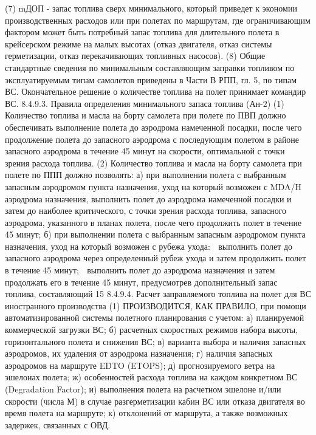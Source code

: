 (7) mДОП - запас топлива сверх минимального, который приведет к экономии производственных расходов или при полетах по маршрутам, где ограничивающим фактором может быть потребный запас топлива для длительного полета в крейсерском режиме на малых высотах (отказ двигателя, отказ системы герметизации, отказ перекачивающих топливных насосов). 
(8) Общие стандартные сведения по минимальным составляющим заправки топливом по эксплуатируемым типам самолетов приведены в Части В РПП, гл. 5, по типам ВС.
Окончательное решение о количестве топлива на полет принимает командир ВС.
8.4.9.3. Правила определения минимального запаса топлива (Ан-2)
(1) Количество топлива и масла на борту самолета при полете по ПВП должно обеспечивать выполнение полета до аэродрома намеченной посадки, после чего продолжение полета до запасного аэродрома с последующим полетом в районе запасного аэродрома в течение 45 минут на скорости, оптимальной с точки зрения расхода топлива. 
(2) Количество топлива и масла на борту самолета при полете по ППП должно позволять: 
а)	при выполнении полета с выбранным запасным аэродромом пункта назначения, уход на который возможен с MDA/H аэродрома назначения, выполнить полет до аэродрома намеченной посадки и затем до наиболее критического, с точки зрения расхода топлива, запасного аэродрома, указанного в планах полета, после чего продолжить полет в течение 45 минут; 
б)	при выполнении полета с выбранным запасным аэродромом пункта назначения, уход на который возможен с рубежа ухода: 
	выполнить полет до запасного аэродрома через определенный рубеж ухода и затем продолжить полет в течение 45 минут; 
	выполнить полет до аэродрома назначения и затем продолжать его в течение 45 минут, предусмотрев дополнительный запас топлива, составляющий 15%
8.4.9.4. Расчет заправляемого топлива на полет для ВС иностранного производства
(1) ПРОИЗВОДИТСЯ, КАК ПРАВИЛО, при помощи автоматизированной системы полетного планирования с учетом: 
а)	планируемой коммерческой загрузки ВС; 
б)	расчетных скоростных режимов набора высоты, горизонтального полета и снижения ВС; 
в)	варианта выбора и наличия запасных аэродромов, их удаления от аэродрома назначения; 
г)	наличия запасных аэродромов на маршруте EDTO (ETOPS); 
д)	прогнозируемого ветра на эшелонах полета; 
ж)  особенностей расхода топлива на каждом конкретном ВС (Degradation Factor); 
и)  выполнения полета на расчетном эшелоне и/или скорости (числа М) в случае разгерметизации кабин ВС или отказа двигателя во время полета на маршруте; 
к)  отклонений от маршрута, а также возможных задержек, связанных с ОВД. 
